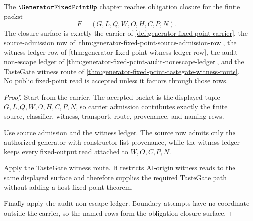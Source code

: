 \begin{theorem}
\label{thm:generator-fixed-point-obligation-closure-upgrade}
The $\GeneratorFixedPointUp$ chapter reaches obligation closure for the finite packet
$$
F=(G,L,Q,W,O,H,C,P,N).
$$
The closure surface is exactly the carrier of \autoref{def:generator-fixed-point-carrier}, the source-admission row of \autoref{thm:generator-fixed-point-source-admission-row}, the witness-ledger row of \autoref{thm:generator-fixed-point-witness-ledger-row}, the audit non-escape ledger of \autoref{thm:generator-fixed-point-audit-nonescape-ledger}, and the TasteGate witness route of \autoref{thm:generator-fixed-point-tastegate-witness-route}. No public fixed-point read is accepted unless it factors through those rows.
\end{theorem}
\begin{proof}
Start from the carrier. The accepted packet is the displayed tuple $G,L,Q,W,O,H,C,P,N$, so carrier admission contributes exactly the finite source, classifier, witness, transport, route, provenance, and naming rows.

Use source admission and the witness ledger. The source row admits only the authorized generator with constructor-list provenance, while the witness ledger keeps every fixed-output read attached to $W,O,C,P,N$.

Apply the TasteGate witness route. It restricts AI-origin witness reads to the same displayed surface and therefore supplies the required TasteGate path without adding a host fixed-point theorem.

Finally apply the audit non-escape ledger. Boundary attempts have no coordinate outside the carrier, so the named rows form the obligation-closure surface.
\end{proof}

